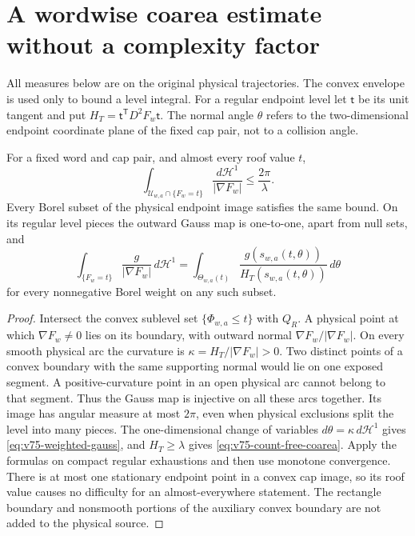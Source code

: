 \section{A wordwise coarea estimate without a complexity factor}
\label{sec:v75-gauss-coarea}
All measures below are on the original physical trajectories. The
convex envelope is used only to bound a level integral.
For a regular endpoint level let $\mathsf t$ be its unit tangent and
put $H_T=\mathsf t^{\mathsf T}D^2F_w\mathsf t$.
The normal angle $\theta$ refers to the two-dimensional endpoint
coordinate plane of the fixed cap pair, not to a collision angle.

\begin{lemma}
\label{lem:v75-total-turning}
For a fixed word and cap pair, and almost every roof value $t$,
\begin{equation}\label{eq:v75-count-free-coarea}
 \int_{\mathcal U_{w,a}\cap\{F_w=t\}}
                  \frac{d\mathcal H^1}{|\nabla F_w|}
                           \le\frac{2\pi}{\lambda}.
\end{equation}
Every Borel subset of the physical endpoint image satisfies the same
bound. On its regular level pieces the outward Gauss map is
one-to-one, apart from null sets, and
\begin{equation}\label{eq:v75-weighted-gauss}
 \int_{\{F_w=t\}}\frac{g}{|\nabla F_w|}\,d\mathcal H^1
       =\int_{\Theta_{w,a}(t)}\frac{g(s_{w,a}(t,\theta))}
                                  {H_T(s_{w,a}(t,\theta))}\,d\theta
\end{equation}
for every nonnegative Borel weight on any such subset.
\end{lemma}
\begin{proof}
Intersect the convex sublevel set $\{\Phi_{w,a}\le t\}$ with
$Q_R$. A physical point at which $\nabla F_w\ne0$ lies on its
boundary, with outward normal $\nabla F_w/|\nabla F_w|$.
On every smooth physical arc the curvature is
$\kappa=H_T/|\nabla F_w|>0$. Two distinct points of a convex
boundary with the same supporting normal would lie on one exposed
segment. A positive-curvature point in an open physical arc cannot
belong to that segment. Thus the Gauss map is injective on all
these arcs together. Its image has angular measure at most $2\pi$,
even when physical exclusions split the level into many pieces.
The one-dimensional change of variables $d\theta=\kappa\,d\mathcal H^1$
gives \eqref{eq:v75-weighted-gauss}, and $H_T\ge\lambda$ gives
\eqref{eq:v75-count-free-coarea}. Apply the formulas on compact
regular exhaustions and then use monotone convergence. There is at
most one stationary endpoint point in a convex cap image, so its
roof value causes no difficulty for an almost-everywhere statement.
The rectangle boundary and nonsmooth portions of the auxiliary convex
boundary are not added to the physical source.
\end{proof}


